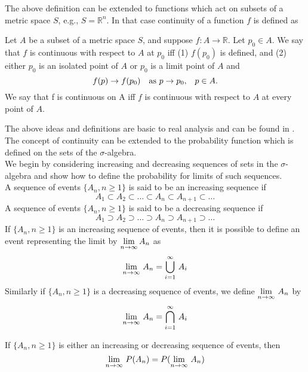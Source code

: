 The above definition can be extended to functions which act on subsets of a metric space $S$, e.g., $S = \mathbb{R}^n$. In that case continuity of a function $f$ is defined as
\begin{definition}
Let $A$ be a subset of a metric space $S$, and suppose $f: A\to \mathbb{R}$. Let $p_0 \in A$. We say that $f$ is {\elevenit continuous with respect to $A$ at $p_0$}\/ iff (1) $f(p_0)$ is defined, and  (2) either
$p_0$ is an isolated point of $A$ or $p_0$ is a limit point of $A$ and 
\[ f(p) \to f(p_0)\quad \hbox{as $p \to p_0$,\quad $p\in A$.}   \] 
We say that {\elevenit f is continuous on A} iff $f$ is continuous with respect to $A$ at every point of $A$.
\end{definition}
The above ideas and definitions are basic to real analysis and can be found in \cite{Protter}.\\

The concept of continuity can be extended to the probability function which is defined on the sets of the $\sigma$-algebra.\\

We begin by considering {\elevenit increasing}\/ and {\elevenit decreasing}\/ sequences of sets in the $\sigma$-algebra and show how to define the probability for limits of such sequences.\\

A sequence of events $\{A_n, n\ge 1\}$ is said to be an {\elevenit increasing sequence}\/ if
$$A_1 \subset A_2 \subset \hdots \subset A_n \subset A_{n+1} \subset \hdots$$
A sequence of events $\{A_n, n\ge 1\}$ is said to be a {\elevenit decreasing sequence} if
$$A_1 \supset A_2 \supset \hdots \supset A_n \supset A_{n+1} \supset \hdots$$
If $\{ A_n, n\ge 1\}$ is an increasing sequence of events, then it is possible to define an event representing the limit by 
$\displaystyle{\lim_{n\rightarrow\infty} A_n}$ as $$\lim_{n\rightarrow\infty}\, A_n = \bigcup\limits_{i=1}^\infty\, A_i$$ Similarly if $\{ A_n, n\ge1\}$ is a decreasing sequence of events, 
we define $\displaystyle{\lim_{n\rightarrow\infty}\, A_n}$ by $$\lim_{n\rightarrow\infty}\, A_n = \bigcap\limits_{i=1}^\infty\, A_i$$

\begin{proposition}
If $\{A_n,n\ge 1\}$ is either an increasing or decreasing sequence of events, then $$\lim_{n\rightarrow\infty} \, P(A_n) = P(\lim_{n\rightarrow\infty}\, A_n)$$
\label{eqn:setlimits}
\end{proposition}

